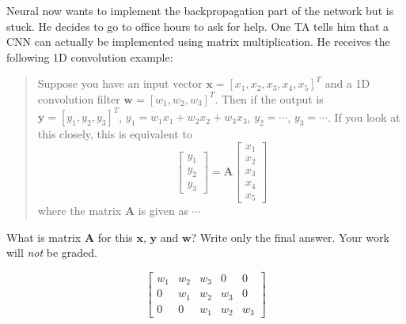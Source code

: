 \documentclass[11pt,addpoints,answers]{exam}
\newcommand{\wv}{\mathbf{w}}
\newcommand{\xv}{\mathbf{x}}
\newcommand{\yv}{\mathbf{y}}
\newcommand{\Av}{\mathbf{A}}
\begin{document}
\begin{questions}
\begin{parts}
\begin{subparts}
\begin{your_solution}[height=1.75cm]
    \end{your_solution}

\newpage

\subpart[2] Neural now wants to implement the backpropagation part of the network but is stuck. He decides to go to office hours to ask for help. One TA tells him that a CNN can actually be implemented using matrix multiplication. He receives the following 1D convolution example:
\begin{quote}
    Suppose you have an input vector $\xv = [x_1, x_2, x_3, x_4, x_5]^T$ and a 1D convolution filter $\wv = [w_1, w_2, w_3]^T$. Then if the output is $\yv = [y_1, y_2, y_3]^T$, $y_1 = w_1 x_1 + w_2 x_2 + w_3 x_3$, $y_2 = \cdots$, $y_3 = \cdots$. If you look at this closely, this is equivalent to
    \[
    \begin{bmatrix} y_1 \\ y_2 \\ y_3 \end{bmatrix} = \Av \begin{bmatrix} x_1 \\ x_2 \\ x_3 \\ x_4 \\ x_5 \end{bmatrix}
    \]
    where the matrix $\Av$ is given as $\cdots$
\end{quote}
What is matrix $\Av$ for this $\xv$, $\yv$ and $\wv$? Write only the final answer. Your work will \textit{not} be graded. \\
    \begin{your_solution}[height=5cm]
    \[
    \begin{bmatrix}
    w_1 & w_2 & w_3 & 0 & 0 \\
0 & w_1 & w_2 & w_3 & 0 \\
0 & 0 & w_1 & w_2 & w_3
    \end{bmatrix}
    \]
    \end{your_solution}

\vspace{5mm}


\end{subparts}
\end{parts}
\end{questions}
\end{document}
